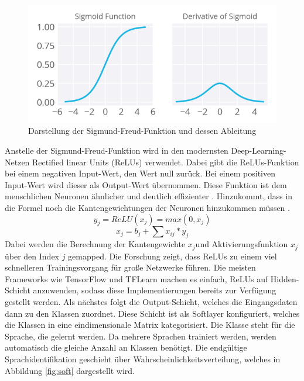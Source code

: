 \begin{figure}[h!]
	\centering
	\includegraphics[width=1.0\linewidth]{images/sigmund}
	\caption{Darstellung der Sigmund-Freud-Funktion und dessen Ableitung \cite{Kulbear.2017}} %
	\label{fig:features11.0}
\end{figure}
Anstelle der Sigmund-Freud-Funktion wird in den modernsten Deep-Learning-Netzen Rectified linear Units (ReLUs) verwendet. Dabei gibt die ReLUs-Funktion bei einem negativen Input-Wert, den Wert null zurück. Bei einem positiven Input-Wert wird dieser als Output-Wert übernommen. Diese Funktion ist dem menschlichen Neuronen ähnlicher und deutlich effizienter \cite{zeiler.2013}. Hinzukommt, dass in die Formel noch die Kantengewichtungen der Neuronen hinzukommen müssen \cite{GonzalezDominguez.2015}.
\begin{equation*}
y_{j} = ReLU(x_{j}) = max(0,x_{j}) 
\label{eq:ReLU}
\end{equation*}
\begin{equation}
x_{ j } = b_{ j } + \sum{ }{ }{ x_{ ij } * y_{j}}
\label{eq:Gewichte}
\end{equation}
Dabei werden die Berechnung der Kantengewichte $x_{j}$und Aktivierungsfunktion $x_{j}$ über den Index $j$ gemapped. 
Die Forschung zeigt, dass ReLUs zu einem viel schnelleren Trainingsvorgang für große Netzwerke führen. Die meisten Frameworks wie TensorFlow und TFLearn machen es einfach, ReLUs auf Hidden-Schicht anzuwenden, sodass diese Implementierungen bereits zur Verfügung gestellt werden. Als nächstes folgt die Output-Schicht, welches die Eingangsdaten dann zu den Klassen zuordnet. Diese Schicht ist als Softlayer konfiguriert, welches die Klassen in eine eindimensionale Matrix kategorisiert. Die Klasse steht für die Sprache, die gelernt werden. Da mehrere Sprachen trainiert werden, werden automatisch die gleiche Anzahl an Klassen benötigt. Die endgültige Sprachidentifikation geschieht über Wahrscheinlichkeitsverteilung, welches in Abbildung \ref{fig:soft} dargestellt wird\cite{Kulbear.2017}.
